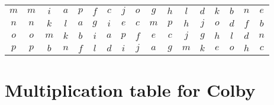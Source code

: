 \documentclass[12pt]{amsart}
\begin{document}
\begin{center}
\begin{tabular}{c|cccccccccccccccc}
	\(m\)  & \(m\)  & \(i\)  & \(a\)  & \(p\)  & \(f\)  & \(c\)  & \(j\)  & \(o\)  & \(g\)  & \(h\)  & \(l\)  & \(d\)  & \(k\)  & \(b\)  & \(n\)  & \(e\)  \\
	\(n\)  & \(n\)  & \(k\)  & \(l\)  & \(a\)  & \(g\)  & \(i\)  & \(e\)  & \(c\)  & \(m\)  & \(p\)  & \(h\)  & \(j\)  & \(o\)  & \(d\)  & \(f\)  & \(b\)  \\
	\(o\)  & \(o\)  & \(m\)  & \(k\)  & \(b\)  & \(i\)  & \(a\)  & \(p\)  & \(f\)  & \(e\)  & \(c\)  & \(j\)  & \(g\)  & \(h\)  & \(l\)  & \(d\)  & \(n\)  \\
	\(p\)  & \(p\)  & \(b\)  & \(n\)  & \(f\)  & \(l\)  & \(d\)  & \(i\)  & \(j\)  & \(a\)  & \(g\)  & \(m\)  & \(k\)  & \(e\)  & \(o\)  & \(h\)  & \(c\)  
\end{tabular}\end{center}\clearpage

\section*{Multiplication table for Colby}
\end{document}
